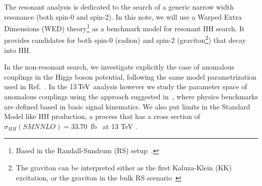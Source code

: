 The resonant analysis is dedicated to the search of a generic narrow width resonance (both spin-0 and spin-2).
In this note, we will use a Warped Extra Dimensions (WED) theory\footnote{Based in the Randall-Sundrum (RS) setup~\cite{Randall:1999ee}. } as a benchmark model for resonant HH search. It provides candidates for both spin-0 (radion) and spin-2 (graviton\footnote{The graviton can be interpreted either as the first Kaluza-Klein (KK) excitation, or the graviton in the bulk RS scenario~\cite{Davoudiasl:2000wi,Csaki:2000zn, Agashe:2007zd} }) that decay into HH. 


In the non-resonant search, we investigate explicitly the case of anomalous couplings in the Higgs boson potential, 
following the same model parametrization used in Ref.~\cite{HIG-13-032}. 
In the 13$\,\text{Te\hspace{-.08em}V}$ analysis however we study the parameter space of anomalous couplings 
using the approach suggested in~\cite{Dall'Osso:2015aia}, where physics benchmarks are defined based in basic signal kinematics. 
We also put limits in the Standard Model like HH production, a process that has a cross section of $\sigma_{HH}(SMNNLO) = 33.70$~fb~ at 13 TeV \cite{MelladoGarcia:2150771}.


